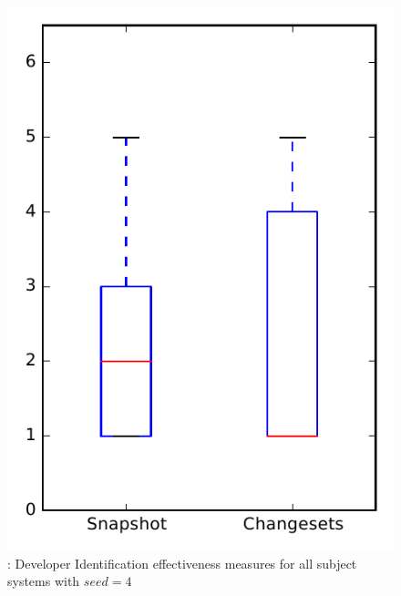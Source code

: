 
\begin{figure}
\centering
\includegraphics[height=0.4\textheight]{figures/dit_seed/rq1_overview_4}
\caption{\rtwo: Developer Identification effectiveness measures for all subject systems with $seed=4$}
\label{fig:dit_seed:rq1:overview}
\end{figure}
